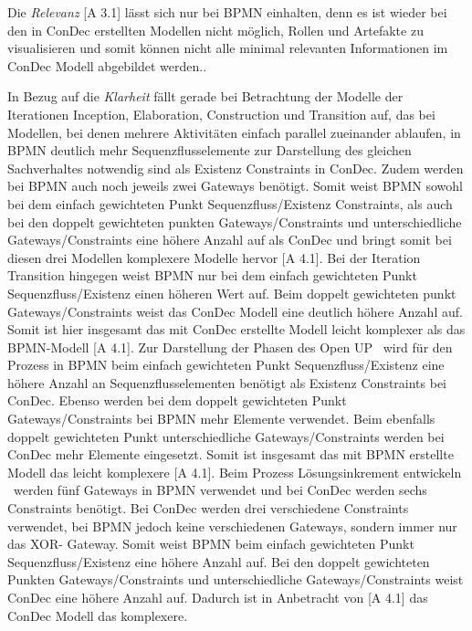 Die \textit{Relevanz} [A 3.1] lässt sich nur bei BPMN einhalten, denn es ist wieder bei den in ConDec erstellten Modellen nicht möglich, Rollen und Artefakte zu visualisieren und somit können nicht alle minimal relevanten Informationen im ConDec Modell abgebildet werden..\newline

In Bezug auf die \textit{Klarheit} fällt gerade bei Betrachtung der Modelle der Iterationen Inception, Elaboration, Construction und Transition auf, das bei Modellen, bei denen mehrere Aktivitäten einfach parallel zueinander ablaufen, in BPMN deutlich mehr Sequenzflusselemente zur Darstellung des gleichen Sachverhaltes notwendig sind als Existenz Constraints in ConDec. Zudem werden bei BPMN auch noch jeweils zwei Gateways benötigt. Somit weist BPMN sowohl bei dem einfach gewichteten Punkt Sequenzfluss/Existenz Constraints, als auch bei den doppelt gewichteten punkten Gateways/Constraints und unterschiedliche Gateways/Constraints eine höhere Anzahl auf als ConDec und bringt somit bei diesen drei Modellen komplexere Modelle hervor [A 4.1]. \newline
Bei der Iteration Transition hingegen weist BPMN nur bei dem einfach gewichteten Punkt Sequenzfluss/Existenz einen höheren Wert auf. Beim doppelt gewichteten punkt Gateways/Constraints weist das ConDec Modell eine deutlich höhere Anzahl auf. Somit ist hier insgesamt das mit ConDec erstellte Modell leicht komplexer als das BPMN-Modell [A 4.1].\newline
Zur Darstellung der  \grqq Phasen des Open UP \grqq \ wird für den Prozess in BPMN beim einfach gewichteten Punkt Sequenzfluss/Existenz eine höhere Anzahl an Sequenzflusselementen benötigt als Existenz Constraints bei ConDec. Ebenso werden bei dem doppelt gewichteten Punkt Gateways/Constraints bei BPMN mehr Elemente verwendet. Beim ebenfalls doppelt gewichteten Punkt unterschiedliche Gateways/Constraints werden bei ConDec mehr Elemente eingesetzt. Somit ist insgesamt das mit BPMN erstellte Modell das leicht komplexere [A 4.1].  \newline
Beim Prozess \grqq Lösungsinkrement entwickeln \grqq \ werden fünf Gateways in BPMN verwendet und bei ConDec werden sechs Constraints benötigt. Bei ConDec werden drei verschiedene Constraints verwendet, bei BPMN jedoch keine verschiedenen Gateways, sondern immer nur das XOR- Gateway. Somit weist BPMN beim einfach gewichteten Punkt Sequenzfluss/Existenz eine höhere Anzahl auf. Bei den doppelt gewichteten Punkten Gateways/Constraints und unterschiedliche Gateways/Constraints weist ConDec eine höhere Anzahl auf. Dadurch ist in Anbetracht von [A 4.1] das ConDec Modell das komplexere.\newline
